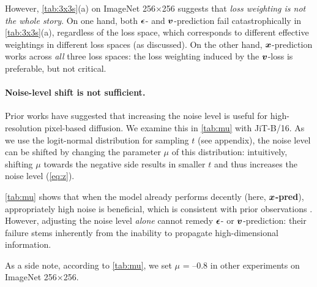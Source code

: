 
However, \cref{tab:3x3s}(a) on ImageNet 256$\times$256 suggests that \textit{loss weighting is not the whole story}.
On one hand, both $\bm{\epsilon}$- and $\bm{v}$-prediction fail catastrophically in \cref{tab:3x3s}(a), regardless of the loss space, which corresponds to different effective weightings in different loss spaces (as discussed).
On the other hand, $\bm{x}$-prediction works across \textit{all} three loss spaces: the loss weighting induced by the $\bm{v}$-loss is preferable, but not critical.\footnotemark{}




\paragraph{Noise-level shift is not sufficient.} Prior works \cite{chen2023importance,hoogeboom2023simple,hoogeboom2024simpler} have suggested that increasing the noise level is useful for high-resolution pixel-based diffusion. We examine this in \cref{tab:mu} with JiT-B/16. 
As we use the logit-normal distribution \cite{esser2024scaling} for sampling $t$ (see appendix), the noise level can be shifted by changing the parameter $\mu$ of this distribution: intuitively, shifting $\mu$ towards the negative side results in smaller $t$ and thus increases the noise level (\cref{eq:z}).

\cref{tab:mu} shows that when the model already performs decently (here, \textbf{$\bm{x}$-pred}), appropriately high noise is beneficial, which is consistent with prior observations \cite{chen2023importance,hoogeboom2023simple,hoogeboom2024simpler}.
However, adjusting the noise level \textit{alone} cannot remedy $\bm{\epsilon}$- or $\bm{v}$-prediction: their failure stems inherently from the inability to propagate high-dimensional information.

As a side note, according to \cref{tab:mu}, we set $\mu$ {=} --0.8 in other experiments on ImageNet 256$\times$256.

